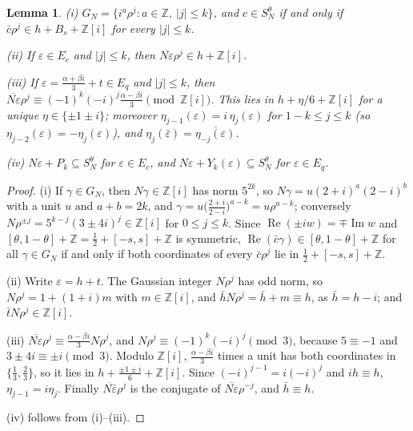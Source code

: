 \documentclass[11pt,a4paper]{amsart}
\newtheorem{lemma}{Lemma}
\theoremstyle{remark}
\newcommand{\Z}{\mathbb{Z}}
\begin{document}
\begin{lemma}\label{lem:values}
\textup{(i)} $G_N=\{i^a\rho^j:a\in\Z,\ |j|\le k\}$, and $c\in S_N^\theta$ if and only if $\bar c\rho^j\in
h+B_s+\Z[i]$ for every $|j|\le k$.

\textup{(ii)} If $\varepsilon\in E_c$ and $|j|\le k$, then $\overline{N\varepsilon}\rho^j\in h+\Z[i]$.

\textup{(iii)} If $\varepsilon=\frac{\alpha+\beta i}3+t\in E_q$ and $|j|\le k$, then
$\overline{N\varepsilon}\rho^j\equiv(-1)^k(-i)^j\frac{\alpha-\beta i}3\pmod{\Z[i]}$. This lies in
$h+\eta/6+\Z[i]$ for a unique $\eta\in\{\pm1\pm i\}$; moreover $\eta_{j-1}(\varepsilon)=i\,\eta_j(\varepsilon)$ for
$1-k\le j\le k$ (so $\eta_{j-2}(\varepsilon)=-\eta_j(\varepsilon)$), and $\eta_j(\bar\varepsilon)=
\overline{\eta_{-j}(\varepsilon)}$.

\textup{(iv)} $N\varepsilon+P_k\subseteq S_N^\theta$ for $\varepsilon\in E_c$, and $N\varepsilon+Y_k(\varepsilon)\subseteq
S_N^\theta$ for $\varepsilon\in E_q$.
\end{lemma}

\begin{proof}
(i) If $\gamma\in G_N$, then $N\gamma\in\Z[i]$ has norm $5^{2k}$, so $N\gamma=u(2+i)^a(2-i)^b$ with a unit $u$ and
$a+b=2k$, and $\gamma=u\big(\frac{2+i}{2-i}\big)^{a-k}=u\rho^{a-k}$; conversely
$N\rho^{\pm j}=5^{k-j}(3\pm4i)^j\in\Z[i]$ for $0\le j\le k$. Since $\operatorname{Re}(\pm iw)=\mp\operatorname{Im}w$
and $[\theta,1-\theta]+\Z=\frac12+[-s,s]+\Z$ is symmetric, $\operatorname{Re}(\bar c\gamma)\in[\theta,1-\theta]+\Z$
for all $\gamma\in G_N$ if and only if both coordinates of every $\bar c\rho^j$ lie in $\frac12+[-s,s]+\Z$.

(ii) Write $\varepsilon=h+t$. The Gaussian integer $N\rho^j$ has odd norm, so $N\rho^j=1+(1+i)m$ with
$m\in\Z[i]$, and $\bar hN\rho^j=\bar h+m\equiv h$, as $\bar h=h-i$; and $\bar tN\rho^j\in\Z[i]$.

(iii) $\overline{N\varepsilon}\rho^j\equiv\frac{\alpha-\beta i}3N\rho^j$, and $N\rho^j\equiv(-1)^k(-i)^j\pmod3$,
because $5\equiv-1$ and $3\pm4i\equiv\pm i\pmod3$. Modulo $\Z[i]$, $\frac{\alpha-\beta i}3$ times a unit has both
coordinates in $\{\frac13,\frac23\}$, so it lies in $h+\frac{\pm1\pm i}6+\Z[i]$. Since $(-i)^{j-1}=i(-i)^j$ and
$ih\equiv h$, $\eta_{j-1}=i\eta_j$. Finally $\overline{N\bar\varepsilon}\rho^j$ is the conjugate of
$\overline{N\varepsilon}\rho^{-j}$, and $\bar h\equiv h$.

(iv) follows from (i)--(iii).
\end{proof}
\end{document}
